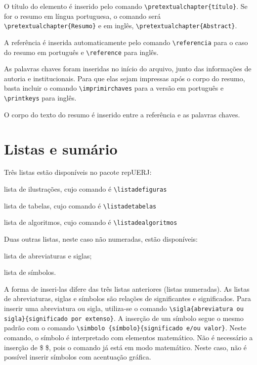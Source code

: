 \documentclass[a4paper,12pt,oneside,onecolumn,final,fleqn]{repUERJ}
\begin{document}
O título do elemento é inserido pelo comando \texttt{\textbackslash pretextualchapter\{título\}}. Se for o resumo em língua portuguesa, o comando será \texttt{\textbackslash pretextualchapter\{Resumo\}} e em inglês, \texttt{\textbackslash pretextualchapter\{Abstract\}}.

A referência é inserida automaticamente pelo comando \texttt{\textbackslash referencia} para o caso do resumo em português e \texttt{\textbackslash reference} para inglês.

As palavras chaves foram inseridas no início do arquivo, junto das informações de autoria e institucionais. Para que elas sejam impressas após o corpo do resumo, basta incluir o comando \texttt{\textbackslash imprimirchaves} para a versão em português e \texttt{\textbackslash printkeys} para inglês.

O corpo do texto do resumo é inserido entre a referência e as palavras chaves.

\section{Listas e sumário}

Três listas estão disponíveis no pacote \textsf{repUERJ}:
\begin{itemizacao}
\item lista de ilustrações, cujo comando é \texttt{\textbackslash listadefiguras}
\item lista de tabelas, cujo comando é \texttt{\textbackslash listadetabelas}
\item lista de algoritmos, cujo comando é \texttt{\textbackslash listadealgoritmos}
\end{itemizacao}

Duas outras listas, neste caso não numeradas, estão disponíveis:
\begin{itemizacao}
\item lista de abreviaturas e siglas;
\item lista de símbolos.
\end{itemizacao}

A forma de inseri-las difere das três listas anteriores (listas numeradas). As listas de abreviaturas, siglas e símbolos são relações de significantes e significados. Para inserir uma abreviatura ou sigla, utiliza-se o comando \texttt{\textbackslash sigla\{abreviatura ou sigla\}\{significado por extenso\}}. A inserção de um símbolo segue o mesmo padrão com o comando \texttt{\textbackslash simbolo \{símbolo\}\{significado e/ou valor\}}. Neste comando, o símbolo é interpretado com elementos matemático. Não é necessário a inserção de \$ \$, pois o comando já está em modo matemático. Neste caso, não é possível inserir símbolos com acentuação gráfica.
\end{document}
